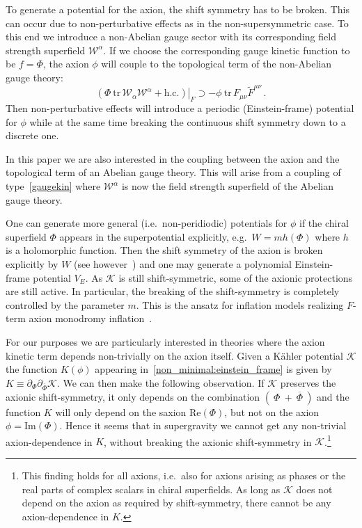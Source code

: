 To generate a potential for the axion, the shift symmetry has to be broken. This can occur due to non-perturbative effects as in the non-supersymmetric case. To this end we introduce a non-Abelian gauge sector with its corresponding field strength superfield $\mathcal{W}^{\alpha}$. If we choose the corresponding gauge kinetic function to be $f=\Phi$, the axion $\phi$ will couple to the topological term of the non-Abelian gauge theory:
\begin{equation}
\label{gaugekin}
{\left. \left( \Phi \ \text{tr} \, \mathcal{W}_{\alpha} \mathcal{W}^{\alpha} + \textrm{h.c.} \right) \right|}_{F} \supset  -\phi \ \text{tr} \, F_{\mu \nu} \tilde{F}^{\mu \nu}  \, .
\end{equation}
Then non-perturbative effects will introduce a periodic (Einstein-frame) potential for $\phi$ while at the same time breaking the continuous shift symmetry down to a discrete one. 

In this paper we are also interested in the coupling between the axion and the topological term of an Abelian gauge theory. This will arise from a coupling of type~\eqref{gaugekin} where $\mathcal{W}^{\alpha}$ is now the field strength superfield of the Abelian gauge theory.  

One can generate more general (i.e.~non-peridiodic) potentials for $\phi$ if the chiral superfield $\Phi$ appears in the superpotential explicitly, e.g.~$W = m h (\Phi)$ where $h$ is a holomorphic function. Then the shift symmetry of the axion is broken explicitly by $W$ (see however~\cite{0811.1989, 1101.0026}) and one may generate a polynomial Einstein-frame potential $V_E$. As $\mathcal{K}$ is still shift-symmetric, some of the axionic protections are still active. In particular, the breaking of the shift-symmetry is completely controlled by the parameter $m$. This is the ansatz for inflation models realizing $F$-term axion monodromy inflation~\cite{1404.3040, 1404.3542, 1404.3711}.

For our purposes we are particularly interested in theories where the axion kinetic term depends non-trivially on the axion itself. Given a K\"ahler potential $\mathcal{K}$ the function $K(\phi)$ appearing in~\eqref{non_minimal:einstein_frame} is given by $K \equiv \partial_{\Phi} \partial_{\overline{\Phi}} \mathcal{K}$. We can then make the following observation. If $\mathcal{K}$ preserves the axionic shift-symmetry, it only depends on the combination $(~\Phi~+~\overline{\Phi}~)$ and the function $K$ will only depend on the saxion $\textrm{Re}(\Phi)$, but not on the axion $\phi = \textrm{Im}(\Phi)$. Hence it seems that in supergravity we cannot get any non-trivial axion-dependence in $K$, without breaking the axionic shift-symmetry in $\mathcal{K}$.\footnote{This finding holds for all axions, i.e.~also for axions arising as phases or the real parts of complex scalars in chiral superfields. As long as $\mathcal{K}$ does not depend on the axion as required by shift-symmetry, there cannot be any axion-dependence in $K$.} 

